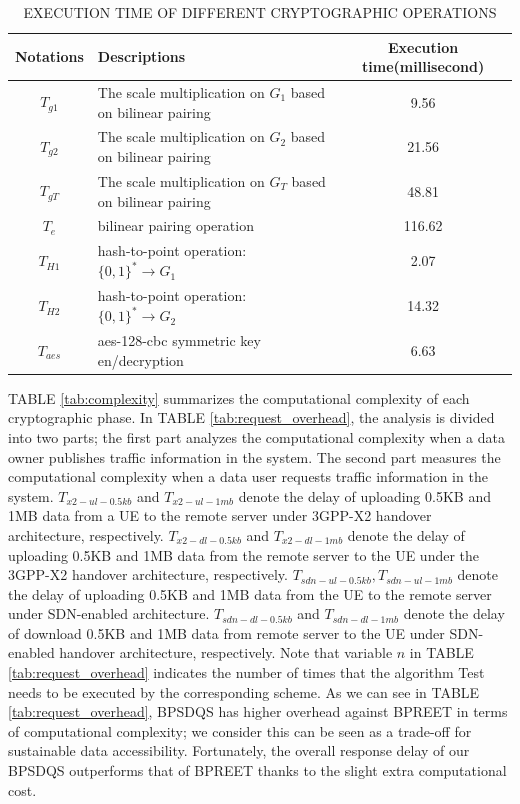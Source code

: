 \documentclass[journal,10pt]{IEEEtran}
\newcounter{phase}[algorithm]
\begin{document}
\begin{table}[t!]
\centering 
\caption{EXECUTION TIME OF DIFFERENT CRYPTOGRAPHIC OPERATIONS \cite{BPREET}}
\begin{tabular}{|c|p{25em}|c|}
    \hline
        Notations & Descriptions & Execution time(millisecond) \\
    \hline
        $T_{g1}$ & The scale multiplication on $G_1$ based on bilinear pairing & 9.56 \\
    \hline
        $T_{g2}$ & The scale multiplication on $G_2$ based on bilinear pairing & 21.56 \\
    \hline
        $T_{gT}$ & The scale multiplication on $G_T$ based on bilinear pairing & 48.81 \\
    \hline
        $T_e$ & bilinear pairing operation & 116.62 \\
    \hline
        $T_{H1}$ & hash-to-point operation: $\{0,1\}^* \to G_1$ & 2.07 \\
    \hline
        $T_{H2}$ & hash-to-point operation: $\{0,1\}^* \to G_2$ & 14.32 \\
    \hline
        $T_{aes}$ & aes-128-cbc symmetric key en/decryption & 6.63 \\
    \hline
\end{tabular}
\label{tab:execution_time}
\end{table}
  
  TABLE \ref{tab:complexity} 
  summarizes the computational complexity of each cryptographic phase. In TABLE \ref{tab:request_overhead}, the analysis is divided into two parts; the first part analyzes the computational complexity when a data owner publishes traffic information in the system. The second part measures the computational complexity when a data user requests traffic information in the system.
 $T_{x2-ul-0.5kb}$ and $T_{x2-ul-1mb}$ denote the delay of uploading 0.5KB and 1MB data from a UE to the remote server under 3GPP-X2 handover architecture, respectively. $T_{x2-dl-0.5kb}$ and $T_{x2-dl-1mb}$ denote the delay of uploading 0.5KB and 1MB data from the remote server to the UE under the 3GPP-X2 handover architecture, respectively. $T_{sdn-ul-0.5kb}, T_{sdn-ul-1mb}$ denote the delay of uploading 0.5KB and 1MB data from the UE to the remote server under SDN-enabled architecture. $T_{sdn-dl-0.5kb}$ and $T_{sdn-dl-1mb}$ denote the delay of download 0.5KB and 1MB data from remote server to the UE under SDN-enabled handover architecture, respectively. Note that variable $n$ in TABLE \ref{tab:request_overhead} indicates the number of times that the algorithm Test needs to be executed by the corresponding scheme.
 As we can see in TABLE \ref{tab:request_overhead}, BPSDQS has higher overhead against BPREET in terms of computational complexity; we consider this can be seen as a trade-off for sustainable data accessibility. Fortunately, the overall response delay of our BPSDQS outperforms that of BPREET thanks to the slight extra computational cost.
\end{document}
